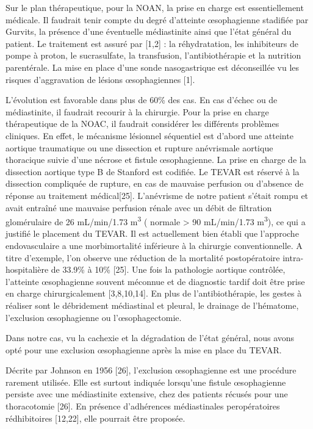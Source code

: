 \documentclass[./tfe.tex]{subfiles}
\begin{document}
Sur le plan thérapeutique, pour la NOAN, la prise en charge est essentiellement médicale. Il faudrait tenir compte du degré d’atteinte œsophagienne stadifiée par Gurvits, la présence d’une éventuelle médiastinite ainsi que l’état général du patient. Le traitement est assuré par [1,2] : la réhydratation, les inhibiteurs de pompe à proton, le sucrasulfate, la transfusion, l’antibiothérapie et la nutrition parentérale. La mise en place d’une sonde nasogastrique est déconseillée vu les risques d’aggravation de lésions œsophagiennes [1].

L’évolution est favorable dans plus de 60\% des cas. En cas d’échec ou de médiastinite, il faudrait recourir à la chirurgie.
Pour la prise en charge thérapeutique de la NOAC, il faudrait considérer les différents problèmes cliniques. En effet, le mécanisme lésionnel séquentiel est d’abord une atteinte aortique traumatique ou une dissection et rupture anévrismale aortique thoracique suivie d’une nécrose et fistule œsophagienne.
La prise en charge de la dissection aortique type B de Stanford est codifiée. Le TEVAR est réservé à la dissection compliquée de rupture, en cas de mauvaise perfusion ou d’absence de réponse au traitement médical[25]. L’anévrisme de notre patient s’était rompu et avait entraîné une mauvaise perfusion rénale avec un débit de filtration glomérulaire de 26 mL/min/1.73 \si{\cubic\meter} ( normale > 90 mL/min/1.73 \si{\cubic\meter}), ce qui a justifié le placement du TEVAR. Il est actuellement bien établi que l’approche endovasculaire a une morbimortalité inférieure à la chirurgie conventionnelle. A titre d’exemple, l’on observe une réduction de la mortalité postopératoire intra-hospitalière de 33.9\% à 10\% [25]. 
Une fois la pathologie aortique contrôlée, l’atteinte œsophagienne souvent méconnue et de diagnostic tardif doit être prise en charge chirurgicalement [3,8,10,14]. En plus de l’antibiothérapie, les gestes à réaliser sont le débridement médiastinal et pleural, le drainage de l’hématome, l’exclusion œsophagienne ou l’œsophagectomie.

Dans notre cas, vu la cachexie et la dégradation de l’état général, nous avons opté pour une exclusion œsophagienne après la mise en place du TEVAR.

Décrite par Johnson en 1956 [26], l’exclusion œsophagienne est une procédure rarement utilisée. Elle est surtout indiquée lorsqu’une fistule œsophagienne persiste avec une médiastinite extensive, chez des patients récusés pour une thoracotomie [26]. En présence d’adhérences médiastinales peropératoires rédhibitoires [12,22], elle pourrait être proposée.
\end{document}

